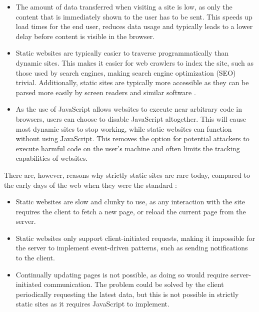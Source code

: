 \begin{itemize}
    \item The amount of data transferred when visiting a site is low, as only the content that is immediately shown to the user has to be sent. This speeds up load times for the end user, reduces data usage and typically leads to a lower delay before content is visible in the browser.
    \item Static websites are typically easier to traverse programmatically than dynamic sites. This makes it easier for web crawlers to index the site, such as those used by search engines, making search engine optimization (SEO) trivial. Additionally, static sites are typically more accessible as they can be parsed more easily by screen readers and similar software \citep{okoye_accessibility_2014}.
    \item As the use of JavaScript allows websites to execute near arbitrary code in browsers, users can choose to disable JavaScript altogether. This will cause most dynamic sites to stop working, while static websites can function without using JavaScript. This removes the option for potential attackers to execute harmful code on the user's machine and often limits the tracking capabilities of websites. 
\end{itemize}

There are, however, reasons why strictly static sites are rare today, compared to the early days of the web when they were the standard \citep{nath_web_2014}:

\begin{itemize}
    \item Static websites are slow and clunky to use, as any interaction with the site requires the client to fetch a new page, or reload the current page from the server.
    \item Static websites only support client-initiated requests, making it impossible for the server to implement event-driven patterns, such as sending notifications to the client.
    \item Continually updating pages is not possible, as doing so would require server-initiated communication. The problem could be solved by the client periodically requesting the latest data, but this is not possible in strictly static sites as it requires JavaScript to implement.
\end{itemize}

